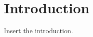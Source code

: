 \documentclass[../masters.tex]{subfiles}
\begin{document}
\section{Introduction}
Insert the introduction.
\end{document}
